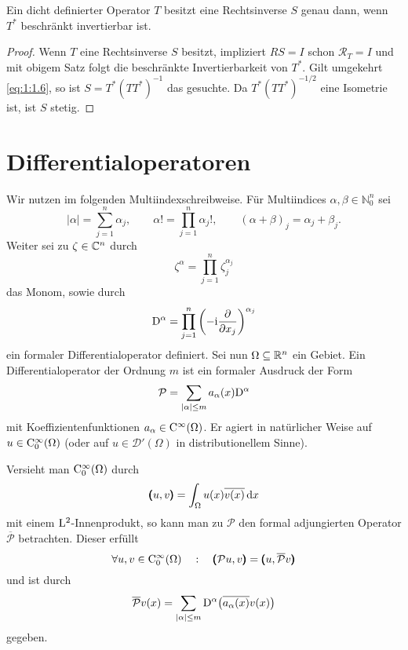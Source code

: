 \begin{cor}\label{cor:1:1.3}
Ein dicht definierter Operator $T$ besitzt eine Rechtsinverse $S$ genau dann, wenn $T^*$ beschränkt invertierbar ist.
\end{cor}
\begin{proof}
Wenn $T$ eine Rechtsinverse $S$ besitzt, impliziert $RS=I$ schon $\mathcal R_T=I$ und mit obigem Satz folgt die beschränkte Invertierbarkeit von $T^*$. Gilt umgekehrt \eqref{eq:1:1.6}, so ist $S=T^*(TT^*)^{-1}$ das gesuchte. Da $T^*(TT^*)^{-1/2}$ eine Isometrie ist, ist $S$ stetig.
\end{proof}

\section{Differentialoperatoren} 
Wir nutzen im folgenden Multiindexschreibweise. Für Multiindices $\alpha,\beta\in\mathbb N_0^n$ sei
\begin{equation}
|\alpha|=\sum_{j=1}^n \alpha_j,\qquad \alpha! = \prod_{j=1}^n \alpha_j!,\qquad (\alpha+\beta)_j=\alpha_j+\beta_j.
\end{equation} 
Weiter sei zu $\zeta\in\mathbb C^n$ durch
\begin{equation}
   \zeta^\alpha = \prod_{j=1}^n \zeta_j^{\alpha_j}
\end{equation}
das Monom, sowie durch
\begin{equation}
   \mathrm D^\alpha = \prod_{j=1}^n \left(- \mathrm i \frac{\partial}{\partial x_j}\right)^{\alpha_j}
\end{equation}
ein formaler Differentialoperator definiert. Sei nun $\Omega\subseteq\mathbb R^n$ ein Gebiet. Ein Differentialoperator der Ordnung $m$ ist ein formaler Ausdruck der Form
\begin{equation}
   \mathcal P = \sum_{|\alpha|\le m} a_\alpha(x) \mathrm D^\alpha
\end{equation}
mit Koeffizientenfunktionen $a_\alpha\in \mathrm C^\infty(\Omega)$. Er agiert in nat\"urlicher Weise auf $u\in\mathrm C^\infty_0(\Omega)$ (oder auf $u\in\mathscr D'(\Omega)$ in distributionellem Sinne).

Versieht man $\mathrm C_0^\infty(\Omega)$ durch
\begin{equation}
    \pmb(u,v\pmb) = \int_{\Omega} u(x) \overline{v(x)} \,\mathrm d x
\end{equation}
mit einem $\mathrm L^2$-Innenprodukt, so kann man zu $\mathcal P$ den formal adjungierten Operator $\overline{\mathcal P}$ betrachten. Dieser erf\"ullt
\begin{equation}
   \forall u,v\in\mathrm C_0^\infty(\Omega)\quad:\quad \pmb(\mathcal Pu,v\pmb)=\pmb(u,\mathcal{\overline P}v\pmb)
\end{equation}
und ist durch
\begin{equation}
  \overline{ \mathcal P}v(x) = \sum_{|\alpha|\le m}  \mathrm D^\alpha\big(\overline{a_\alpha(x)}v(x)\big)
\end{equation}
gegeben.


